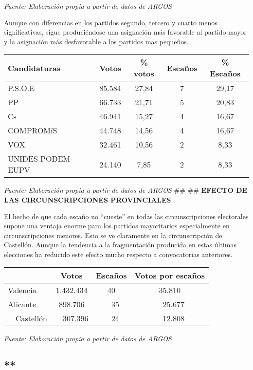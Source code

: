 \documentclass[
]{article}
\begin{document}
\emph{Fuente: Elaboración propia a partir de datos de ARGOS}

Aunque con diferencias en los partidos segundo, tercero y cuarto menos
significativas, sigue produciéndose una asignación más favorable al
partido mayor y la asignación más desfavorable a los partidos mas
pequeños.

\begin{longtable}[]{@{}lcccc@{}}
\toprule\noalign{}
\textbf{Candidaturas} & \textbf{Votos} & \textbf{\% votos} &
\textbf{Escaños} & \textbf{\% Escaños} \\
\midrule\noalign{}
\endhead
\bottomrule\noalign{}
\endlastfoot
P.S.O.E & 85.584 & 27,84 & 7 & 29,17 \\
PP & 66.733 & 21,71 & 5 & 20,83 \\
Cs & 46.941 & 15,27 & 4 & 16,67 \\
COMPROMíS & 44.748 & 14,56 & 4 & 16,67 \\
VOX & 32.461 & 10,56 & 2 & 8,33 \\
UNIDES PODEM-EUPV & 24.140 & 7,85 & 2 & 8,33 \\
\end{longtable}

\emph{Fuente: Elaboración propia a partir de datos de ARGOS} \#\# \#\#
\textbf{EFECTO DE LAS CIRCUNSCRIPCIONES PROVINCIALES}

El hecho de que cada escaño no ``cueste'' en todas las circunscripciones
electorales supone una ventaja enorme para los partidos mayoritarios
especialmente en circunscripciones menores. Esto se ve claramente en la
circunscripción de Castellón. Aunque la tendencia a la fragmentación
producida en estas últimas elecciones ha reducido este efecto mucho
respecto a convocatorias anteriores.

\begin{longtable}[]{@{}lccc@{}}
\toprule\noalign{}
& \textbf{Votos} & \textbf{Escaños} & \textbf{Votos por escaños} \\
\midrule\noalign{}
\endhead
\bottomrule\noalign{}
\endlastfoot
Valencia & 1.432.434 & 40 & 35.810 \\
Alicante & 898.706 &  35 &  25.677 \\
 Castellón &  307.396 &  24 &  12.808 \\
\end{longtable}

\emph{Fuente: Elaboración propia a partir de datos de ARGOS}

\hypertarget{section-1}{%
\subsection{**}\label{section-1}}
\end{document}
